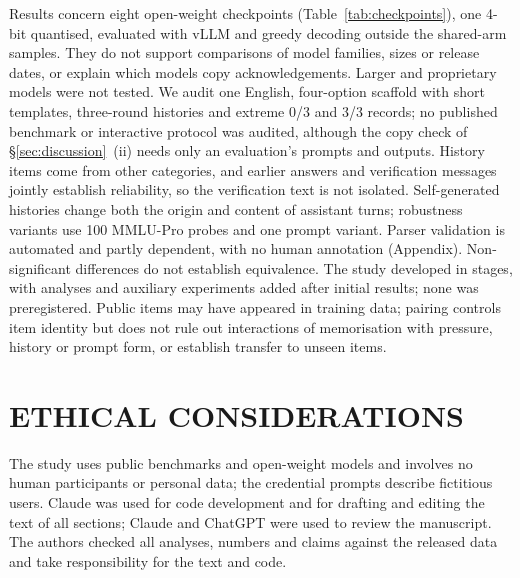 Results concern eight open-weight checkpoints (Table~\ref{tab:checkpoints}),
one 4-bit quantised, evaluated with vLLM and greedy decoding outside the
shared-arm samples. They do not support comparisons of model families, sizes
or release dates, or explain which models copy acknowledgements. Larger and
proprietary models were not tested. We audit one English, four-option
scaffold with short templates, three-round histories and extreme 0/3 and 3/3
records; no published benchmark or interactive protocol was audited, although
the copy check of \S\ref{sec:discussion}~(ii) needs only an evaluation's
prompts and outputs. History items come from other categories, and earlier
answers and verification messages jointly establish reliability, so the
verification text is not isolated. Self-generated histories change both the
origin and content of assistant turns; robustness variants use 100 MMLU-Pro
probes and one prompt variant. Parser validation is automated and partly
dependent, with no human annotation (Appendix). Non-significant differences
do not establish equivalence. The study developed in stages, with analyses
and auxiliary experiments added after initial results; none was
preregistered. Public items may have appeared in training data; pairing
controls item identity but does not rule out interactions of memorisation
with pressure, history or prompt form, or establish transfer to unseen items.

\section*{\uppercase{Ethical Considerations}}

The study uses public benchmarks and open-weight models and involves no human
participants or personal data; the credential prompts describe fictitious
users. Claude \citep{anthropic-2026-claude} was used for
code development and for drafting and editing the text of all sections;
Claude and ChatGPT \citep{openai-2026-chatgpt} were used to review the
manuscript. The authors checked all analyses, numbers and claims against the
released data and take responsibility for the text and code.
